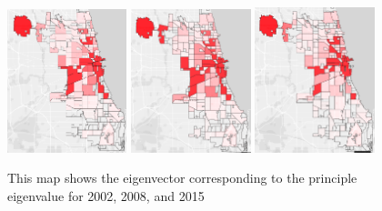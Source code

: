 \documentclass{article}
\theoremstyle{definition}
\theoremstyle{remark}
\begin{document}
\begin{figure}[H]
    \centering
    \includegraphics[width=0.31\textwidth]{Jobs-S000-2002}
    \includegraphics[width=0.31\textwidth]{Jobs-S000-2008}
    \includegraphics[width=0.31\textwidth]{Jobs-S000-2015}

        
    \caption{This map shows the eigenvector corresponding to the principle eigenvalue for 2002, 2008, and 2015}
    \label{fig:Jobs-S000-2008}
\end{figure}
\end{document}
